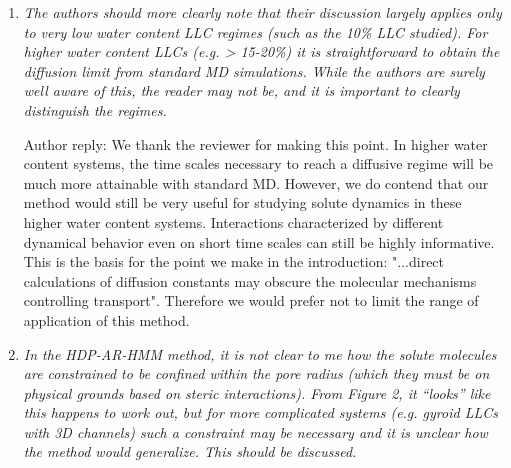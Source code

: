 \documentclass{article}
\begin{document}
\begin{enumerate}[label={Comment \theenumi :}, leftmargin=3.9\parindent]
    \item \textit{The authors should more clearly note that their discussion largely applies only 
    to very low water content LLC regimes (such as the 10\% LLC studied). For higher water content 
    LLCs (e.g. > 15-20\%) it is straightforward to obtain the diffusion limit from standard MD 
    simulations. While the authors are surely well aware of this, the reader may not be, and it is
    important to clearly distinguish the regimes.}
    
    Author reply: We thank the reviewer for making this point. In higher water content systems, 
    the time scales necessary to reach a diffusive regime will be much more attainable with 
    standard MD. However, we do contend that our method would still be very useful for studying
    solute dynamics in these higher water content systems. Interactions characterized by different
    dynamical behavior even on short time scales can still be highly informative. This is the
    basis for the point we make in the introduction: "...direct calculations of diffusion 
    constants may obscure the molecular mechanisms controlling transport". Therefore we would
    prefer not to limit the range of application of this method. 

    \item \textit{In the HDP-AR-HMM method, it is not clear to me how the solute molecules are 
    constrained to be confined within the pore radius (which they must be on physical grounds 
    based on steric interactions). From Figure 2, it “looks” like this happens to work out, but
    for more complicated systems (e.g. gyroid LLCs with 3D channels) such a constraint may be 
    necessary and it is unclear how the method would generalize. This should be discussed.}
    

\end{enumerate}
\end{document}
